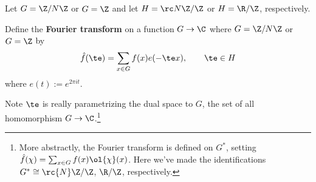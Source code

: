 %

\begin{df}
Let $G=\Z/N\Z$ or $G=\Z$ and let $H=\rc N\Z/\Z$ or $H=\R/\Z$, respectively.

Define the \textbf{Fourier transform} on a function $G\to \C$ where $G=\Z/N\Z$ or $G=\Z$ by
\[
\hat{f}(\te)=\sum_{x\in G}f(x)e(-\te x), \qquad \te\in H
\]
where $e(t):=e^{2\pi i t}$.
\end{df}
Note $\te$ is really parametrizing the dual space to $G$, the set of all homomorphism $G\to \C$.\footnote{More abstractly, the Fourier transform is defined on $G^*$, setting $\hat{f}(\chi)=\sum_{x\in G} f(x)\ol{\chi}(x)$. Here we've made the identifications $G^*\cong \rc{N}\Z/\Z$, $\R/\Z$, respectively.}
 

